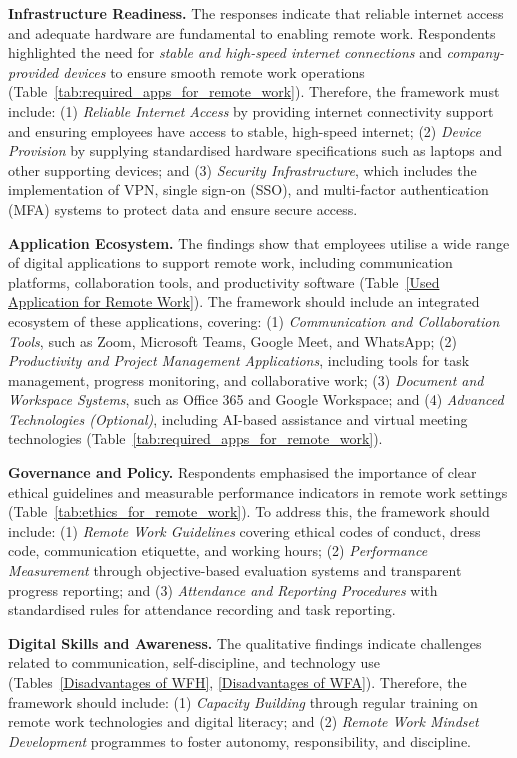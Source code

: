 \documentclass[a4paper, conference]{IEEEtran}
\begin{document}
\textbf{Infrastructure Readiness.}
The responses indicate that reliable internet access and adequate hardware are fundamental to enabling remote work. Respondents highlighted the need for \textit{stable and high-speed internet connections} and \textit{company-provided devices} to ensure smooth remote work operations (Table~\ref{tab:required_apps_for_remote_work}). Therefore, the framework must include: (1) \textit{Reliable Internet Access} by providing internet connectivity support and ensuring employees have access to stable, high-speed internet; (2) \textit{Device Provision} by supplying standardised hardware specifications such as laptops and other supporting devices; and (3) \textit{Security Infrastructure}, which includes the implementation of VPN, single sign-on (SSO), and multi-factor authentication (MFA) systems to protect data and ensure secure access.

\textbf{Application Ecosystem.}
The findings show that employees utilise a wide range of digital applications to support remote work, including communication platforms, collaboration tools, and productivity software (Table~\ref{Used Application for Remote Work}). The framework should include an integrated ecosystem of these applications, covering: (1) \textit{Communication and Collaboration Tools}, such as Zoom, Microsoft Teams, Google Meet, and WhatsApp; (2) \textit{Productivity and Project Management Applications}, including tools for task management, progress monitoring, and collaborative work; (3) \textit{Document and Workspace Systems}, such as Office 365 and Google Workspace; and (4) \textit{Advanced Technologies (Optional)}, including AI-based assistance and virtual meeting technologies (Table~\ref{tab:required_apps_for_remote_work}).

\textbf{Governance and Policy.}
Respondents emphasised the importance of clear ethical guidelines and measurable performance indicators in remote work settings (Table~\ref{tab:ethics_for_remote_work}). To address this, the framework should include: (1) \textit{Remote Work Guidelines} covering ethical codes of conduct, dress code, communication etiquette, and working hours; (2) \textit{Performance Measurement} through objective-based evaluation systems and transparent progress reporting; and (3) \textit{Attendance and Reporting Procedures} with standardised rules for attendance recording and task reporting.

\textbf{Digital Skills and Awareness.}
The qualitative findings indicate challenges related to communication, self-discipline, and technology use (Tables~\ref{Disadvantages of WFH}, \ref{Disadvantages of WFA}). Therefore, the framework should include: (1) \textit{Capacity Building} through regular training on remote work technologies and digital literacy; and (2) \textit{Remote Work Mindset Development} programmes to foster autonomy, responsibility, and discipline.
\end{document}
